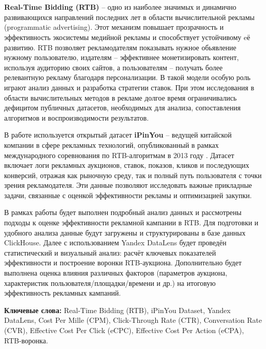 \section*{}
\textbf{Real-Time Bidding (RTB)} -- одно из наиболее значимых и динамично развивающихся направлений последних лет в области вычислительной рекламы (programmatic advertising). Этот механизм повышает прозрачность и эффективность экосистемы медийной рекламы и способствует устойчивому eё развитию. RTB позволяет рекламодателям показывать нужное обьявление нужному пользователю, издателям -- эффективнее монетизировать контент, используя аудиторию своих сайтов, а пользователям -- получать более релевантную рекламу благодаря персонализации. В такой модели особую роль играют анализ данных и разработка стратегии ставок. При этом исследования в области вычислительных методов в рекламе долгое время ограничивались дефицитом публичных датасетов, необходимых для анализа, сопоставления алгоритмов и воспроизводимости результатов.

В работе используется открытый датасет \textbf{iPinYou} -- ведущей китайской компании в сфере рекламных технологий, опубликованный в рамках международного соревнования по RTB-алгоритмам в 2013 году \cite{ipinyou-contest-database}. Датасет включает логи рекламных аукционов, ставок, показов, кликов и последующих конверсий, отражая как рыночную среду, так и полный путь пользователя с точки зрения рекламодателя. Эти данные позволяют исследовать важные прикладные задачи, связанные с оценкой эффективности рекламы и оптимизацией закупки.

В рамках работы будет выполнен подробный анализ данных и рассмотрены подходы к оценке эффективности рекламной кампании в RTB. Для подготовки и удобного анализа данные будут загружены и структурированы в базе данных ClickHouse. Далее с использованием Yandex DataLens будет проведён статистический и визуальный анализ: расчёт ключевых показателей эффективности и построение воронки RTB-аукциона. Дополнительно будет выполнена оценка влияния различных факторов (параметров аукциона, характеристик пользователя/площадки/времени и др.) на итоговую эффективность рекламных кампаний.

\vspace{2em}
\textbf{Ключевые слова:} Real-Time Bidding (RTB), iPinYou Dataset, Yandex DataLens, Cost Per Mille (CPM), Click-Through Rate (CTR), Conversation Rate (CVR), Effective Cost Per Click (eCPC), Effective Cost Per Action (eCPA), RTB-воронка.

